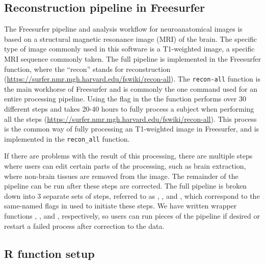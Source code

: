 \subsection{Reconstruction pipeline in
Freesurfer}\label{reconstruction-pipeline-in-freesurfer}

The Freesurfer pipeline and analysis workflow for neuroanatomical images
is based on a structural magnetic resonance image (MRI) of the brain.
The specific type of image commonly used in this software is a
T1-weighted image, a specific MRI sequence commonly taken. The full
pipeline is implemented in the Freesurfer  function,
where the ``recon'' stands for reconstruction
(\url{https://surfer.nmr.mgh.harvard.edu/fswiki/recon-all}). The
\texttt{recon-all} function is the main workhorse of Freesurfer and is
commonly the one command used for an entire processing pipeline. Using
the  flag in the the  function performs over
30 different steps and takes 20-40 hours to fully process a subject when
performing all the steps
(\url{https://surfer.nmr.mgh.harvard.edu/fswiki/recon-all}). This
process is the common way of fully processing an T1-weighted image in
Freesurfer, and is implemented in the \texttt{recon\_all}
 function.

If there are problems with the result of this processing, there are
multiple steps where users can edit certain parts of the processing,
such as brain extraction, where non-brain tissues are removed from the
image. The remainder of the pipeline can be run after these steps are
corrected. The full pipeline is broken down into 3 separate sets of
steps, referred to as , , and
, which correspond to the same-named flags in
 used to initiate these steps. We have written wrapper
functions , , and ,
respectively, so users can run pieces of the pipeline if desired or
restart a failed process after correction to the data.

\subsection{R function setup}\label{r-function-setup}

